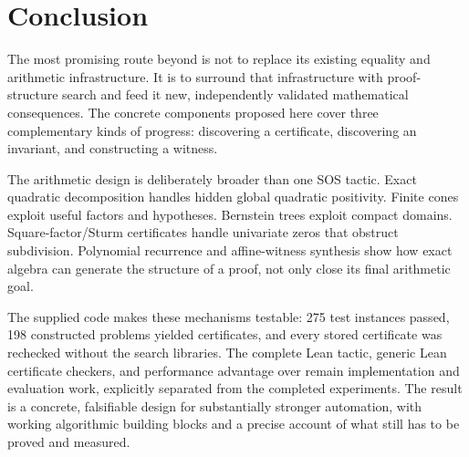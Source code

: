 \section{Conclusion}

The most promising route beyond \grind{} is not to replace its existing equality and arithmetic infrastructure. It is to surround that infrastructure with proof-structure search and feed it new, independently validated mathematical consequences. The concrete components proposed here cover three complementary kinds of progress: discovering a certificate, discovering an invariant, and constructing a witness.

The arithmetic design is deliberately broader than one SOS tactic. Exact quadratic decomposition handles hidden global quadratic positivity. Finite cones exploit useful factors and hypotheses. Bernstein trees exploit compact domains. Square-factor/Sturm certificates handle univariate zeros that obstruct subdivision. Polynomial recurrence and affine-witness synthesis show how exact algebra can generate the structure of a proof, not only close its final arithmetic goal.

The supplied code makes these mechanisms testable: 275 test instances passed, 198 constructed problems yielded certificates, and every stored certificate was rechecked without the search libraries. The complete Lean tactic, generic Lean certificate checkers, and performance advantage over \grind{} remain implementation and evaluation work, explicitly separated from the completed experiments. The result is a concrete, falsifiable design for substantially stronger automation, with working algorithmic building blocks and a precise account of what still has to be proved and measured.
